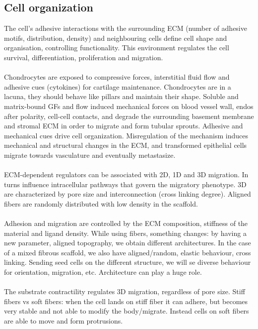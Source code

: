 \subsection{Cell organization}
The cell's adhesive interactions with the surrounding ECM (number of adhesive motifs, distribution, density) and neighbouring cells define cell shape and organisation, controlling functionality. This environment regulates the cell survival, differentiation, proliferation and migration.
\\
\\
\noindent
Chondrocytes are exposed to compressive forces, interstitial fluid flow and adhesive cues (cytokines) for cartilage maintenance. Chondrocytes are in a lacuna, they should behave like pillars and maintain their shape.
Soluble and matrix-bound GFs and flow induced mechanical forces on blood vessel wall, endos after polarity, cell-cell contacts, and degrade the surrounding basement membrane and stromal ECM in order to migrate and form tubular sprouts.
Adhesive and mechanical cues drive cell organization. Misregulation of the mechanism induces mechanical and structural changes in the ECM, and transformed epithelial cells migrate towards vasculature and eventually metastasize.
\\
\\
\noindent
ECM-dependent regulators can be associated with 2D, 1D and 3D migration. In turns influence intracellular pathways that govern the migratory phenotype. 3D are characterized by pore size and interconnection (cross linking degree). Aligned fibers are randomly distributed with low density in the scaffold.
\\
\\
\noindent
Adhesion and migration are controlled by the ECM composition, stiffness of the material and ligand density. While using fibers, something changes: by having a new parameter, aligned topography, we obtain different architectures. In the case of a mixed fibrous scaffold, we also have aligned/random, elastic behaviour, cross linking. Sending seed cells on the different structure, we will se diverse behaviour for orientation, migration, etc. Architecture can play a huge role.
\\
\\
\noindent
The substrate contractility regulates 3D migration, regardless of pore size. Stiff fibers vs soft fibers: when the cell lands on stiff fiber it can adhere, but becomes very stable and not able to modify the body/migrate. Instead cells on soft fibers are able to move and form protrusions.
